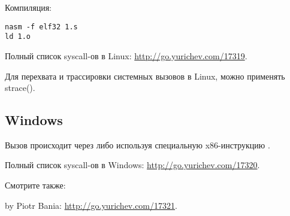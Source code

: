 

Компиляция:

\begin{lstlisting}
nasm -f elf32 1.s
ld 1.o
\end{lstlisting}

Полный список syscall-ов в Linux: \url{http://go.yurichev.com/17319}.

Для перехвата и трассировки системных вызовов в Linux, можно применять strace().

\subsection{Windows}


Вызов происходит через  
либо используя специальную x86-инструкцию .

Полный список syscall-ов в Windows: \url{http://go.yurichev.com/17320}.

Смотрите также:

 by Piotr Bania: \url{http://go.yurichev.com/17321}.

